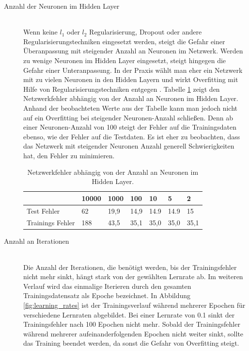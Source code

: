 \begin{description}
	\item[Anzahl der Neuronen im Hidden Layer]\hfill \\
	Wenn keine $l_1$ oder $l_2$ Regularisierung, Dropout \cite{dropout} oder andere Regularisierungstechniken eingesetzt werden, steigt die Gefahr einer Überanpassung mit steigender Anzahl an Neuronen im Netzwerk. Werden zu wenige Neuronen im Hidden Layer eingesetzt, steigt hingegen die Gefahr einer Unteranpassung. In der Praxis wählt man eher ein Netzwerk mit zu vielen Neuronen in den Hidden Layern und wirkt Overfitting mit Hilfe von Regularisierungstechniken entgegen \cite{geron2017hands-on}. Tabelle \ref{table:overfitting} zeigt den Netzwerkfehler abhängig von der Anzahl an Neuronen im Hidden Layer. Anhand der beobachteten Werte aus der Tabelle kann man jedoch nicht auf ein Overfitting bei steigender Neuronen-Anzahl schließen. Denn ab einer Neuronen-Anzahl von 100 steigt der Fehler auf die Trainingsdaten ebenso, wie der Fehler auf die Testdaten. Es ist eher zu beobachten, dass das Netzwerk mit steigender Neuronen Anzahl generell Schwierigkeiten hat, den Fehler zu minimieren.
	\begin{table}[ht]
		\centering
		\begin{tabular}{l|llllll}
			& 10000 & 1000 & 100  & 10   & 5    & 2    \\ \hline
			Test Fehler      & 62    & 19,9 & 14,9 & 14.9 & 14.9 & 15   \\
			Trainings Fehler & 188   & 43,5 & 35,1 & 35,0 & 35,0 & 35,1
		\end{tabular}
		\caption{\label{table:overfitting}Netzwerkfehler abhängig von der Anzahl an Neuronen im Hidden Layer.}
	\end{table}
	
	\item[Anzahl an Iterationen]\hfill \\
	Die Anzahl der Iterationen, die benötigt werden, bis der Trainingsfehler nicht mehr sinkt, hängt stark von der gewählten Lernrate ab. Im weiteren Verlauf wird das einmalige Iterieren durch den gesamten Trainingsdatensatz als Epoche bezeichnet. In Abbildung \ref*{fig:learning_rates} ist der Trainingsverlauf während mehrerer Epochen für verschiedene Lernraten abgebildet. Bei einer Lernrate von 0.1 sinkt der Trainingsfehler nach 100 Epochen nicht mehr. Sobald der Trainingsfehler während mehrerer aufeinanderfolgenden Epochen nicht weiter sinkt, sollte das Training beendet werden, da sonst die Gefahr von Overfitting steigt.
	

\end{description}
